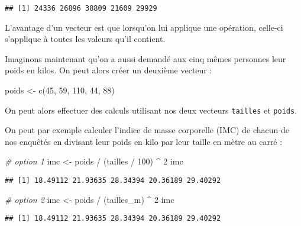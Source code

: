 \documentclass[
]{article}
\newenvironment{Shaded}{\begin{snugshade}}{\end{snugshade}}
\newcommand{\CommentTok}[1]{\textcolor[rgb]{0.56,0.35,0.01}{\textit{#1}}}
\newcommand{\DecValTok}[1]{\textcolor[rgb]{0.00,0.00,0.81}{#1}}
\newcommand{\FunctionTok}[1]{\textcolor[rgb]{0.00,0.00,0.00}{#1}}
\newcommand{\NormalTok}[1]{#1}
\newcommand{\OtherTok}[1]{\textcolor[rgb]{0.56,0.35,0.01}{#1}}
\newcommand{\SpecialCharTok}[1]{\textcolor[rgb]{0.00,0.00,0.00}{#1}}
\begin{document}
\begin{verbatim}
## [1] 24336 26896 38809 21609 29929
\end{verbatim}

L'avantage d'un vecteur est que lorsqu'on lui applique une opération,
celle-ci s'applique à toutes les valeurs qu'il contient.

Imaginons maintenant qu'on a aussi demandé aux cinq mêmes personnes leur
poids en kilos. On peut alors créer un deuxième vecteur :

\begin{Shaded}
\begin{Highlighting}[]
\NormalTok{poids }\OtherTok{\textless{}{-}} \FunctionTok{c}\NormalTok{(}\DecValTok{45}\NormalTok{, }\DecValTok{59}\NormalTok{, }\DecValTok{110}\NormalTok{, }\DecValTok{44}\NormalTok{, }\DecValTok{88}\NormalTok{)}
\end{Highlighting}
\end{Shaded}

On peut alors effectuer des calculs utilisant nos deux vecteurs
\texttt{tailles} et \texttt{poids}.

On peut par exemple calculer l'indice de masse corporelle (IMC) de
chacun de nos enquêtés en divisant leur poids en kilo par leur taille en
mètre au carré :

\begin{Shaded}
\begin{Highlighting}[]
\CommentTok{\# option 1}
\NormalTok{imc }\OtherTok{\textless{}{-}}\NormalTok{ poids }\SpecialCharTok{/}\NormalTok{ (tailles }\SpecialCharTok{/} \DecValTok{100}\NormalTok{) }\SpecialCharTok{\^{}} \DecValTok{2}
\NormalTok{imc}
\end{Highlighting}
\end{Shaded}

\begin{verbatim}
## [1] 18.49112 21.93635 28.34394 20.36189 29.40292
\end{verbatim}

\begin{Shaded}
\begin{Highlighting}[]
\CommentTok{\# option 2}
\NormalTok{imc }\OtherTok{\textless{}{-}}\NormalTok{ poids }\SpecialCharTok{/}\NormalTok{ (tailles\_m) }\SpecialCharTok{\^{}} \DecValTok{2}
\NormalTok{imc}
\end{Highlighting}
\end{Shaded}

\begin{verbatim}
## [1] 18.49112 21.93635 28.34394 20.36189 29.40292
\end{verbatim}
\end{document}
